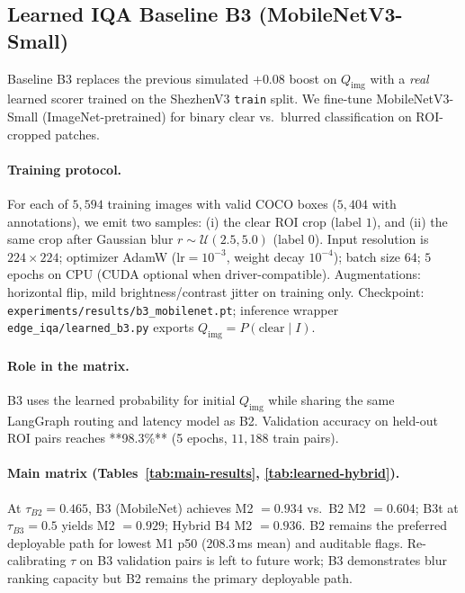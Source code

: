 \subsection{Learned IQA Baseline B3 (MobileNetV3-Small)}
\label{sec:b3-learned}

Baseline B3 replaces the previous simulated $+0.08$ boost on $Q_{\mathrm{img}}$ with a \emph{real} learned scorer trained on the ShezhenV3 \texttt{train} split.
We fine-tune MobileNetV3-Small (ImageNet-pretrained) for binary clear vs.\ blurred classification on ROI-cropped patches.

\paragraph{Training protocol.}
For each of $5{,}594$ training images with valid COCO boxes ($5{,}404$ with annotations), we emit two samples: (i) the clear ROI crop (label $1$), and (ii) the same crop after Gaussian blur $r{\sim}\mathcal{U}(2.5,5.0)$ (label $0$).
Input resolution is $224{\times}224$; optimizer AdamW ($\mathrm{lr}{=}10^{-3}$, weight decay $10^{-4}$); batch size $64$; $5$ epochs on CPU (CUDA optional when driver-compatible).
Augmentations: horizontal flip, mild brightness/contrast jitter on training only.
Checkpoint: \texttt{experiments/results/b3\_mobilenet.pt}; inference wrapper \texttt{edge\_iqa/learned\_b3.py} exports $Q_{\mathrm{img}} = P(\mathrm{clear}\mid I)$.

\paragraph{Role in the matrix.}
B3 uses the learned probability for initial $Q_{\mathrm{img}}$ while sharing the same LangGraph routing and latency model as B2.
Validation accuracy on held-out ROI pairs reaches **98.3\%** (5 epochs, $11{,}188$ train pairs).
\paragraph{Main matrix (Tables~\ref{tab:main-results}, \ref{tab:learned-hybrid}).}
At $\tau_{B2}{=}0.465$, B3 (MobileNet) achieves M2 $=0.934$ vs.\ B2 M2 $=0.604$; B3t at $\tau_{B3}{=}0.5$ yields M2 $=0.929$; Hybrid B4 M2 $=0.936$.
B2 remains the preferred deployable path for lowest M1 p50 (208.3\,ms mean) and auditable flags.
Re-calibrating $\tau$ on B3 validation pairs is left to future work; B3 demonstrates blur ranking capacity but B2 remains the primary deployable path.
